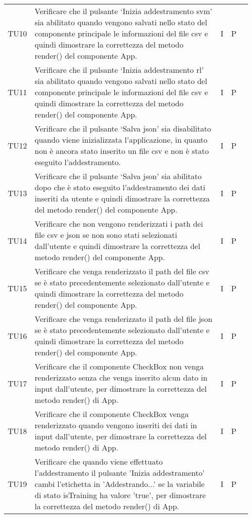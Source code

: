 \begin{longtable} {
		>{}p{15mm} 
		>{}p{79.5mm}
		>{}p{15mm} 
		>{}p{15mm}
		>{}p{0mm}}
	TU10		& Verificare che il pulsante ‘Inizia addestramento svm’ sia abilitato quando vengono salvati nello stato del componente principale le informazioni del file csv e quindi dimostrare la correttezza del metodo render() del componente App.& I & P &\TBstrut \\ [2mm]
	TU11    	& Verificare che il pulsante ‘Inizia addestramento rl’ sia abilitato quando vengono salvati nello stato del componente principale le informazioni del file csv e quindi dimostrare la correttezza del metodo render() del componente App.& I & P &\TBstrut \\ [2mm]
	TU12    	& Verificare che il pulsante ‘Salva json’ sia disabilitato quando viene inizializzata l’applicazione, in quanto non è ancora stato inserito un file csv e non è stato eseguito l’addestramento.& I & P &\TBstrut \\ [2mm]
	TU13     	& Verificare che il pulsante ‘Salva json’ sia abilitato dopo che è stato eseguito l’addestramento dei dati inseriti da utente e quindi dimostrare la correttezza del metodo render() del componente App.& I & P &\TBstrut \\ [2mm]
	TU14	    & Verificare che non vengono renderizzati i path dei file csv e json se non sono stati selezionati dall’utente e quindi dimostrare la correttezza del metodo render() del componente App.& I & P &\TBstrut \\ [2mm]
	TU15     	& Verificare che venga renderizzato il path del file csv se è stato precedentemente selezionato dall’utente e quindi dimostrare la correttezza del metodo render() del componente App.& I & P &\TBstrut \\ [2mm]
	TU16	    & Verificare che venga renderizzato il path del file json se è stato precedentemente selezionato dall’utente e quindi dimostrare la correttezza del metodo render() del componente App.& I & P &\TBstrut \\ [2mm]
	TU17		& Verificare che il componente CheckBox non venga renderizzato senza che venga inserito alcun dato in input dall'utente, per dimostrare la correttezza del metodo render() di App.& I & P &\TBstrut \\ [2mm]
	TU18		& Verificare che il componente CheckBox venga renderizzato quando vengono inseriti dei dati in input dall'utente, per dimostrare la correttezza del metodo render() di App.& I & P &\TBstrut \\ [2mm]
	TU19		& Verificare che quando viene effettuato l'addestramento il pulsante 'Inizia addestramento' cambi l'etichetta in 'Addestrando...' se la variabile di stato isTraining ha valore 'true', per dimostrare la correttezza del metodo render() di App.& I & P &\TBstrut \\ [2mm]

\end{longtable}
